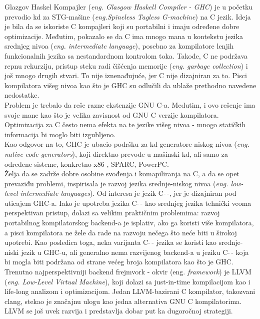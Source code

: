 Glazgov Haskel Kompajler (\emph {eng. Glasgow Haskell Compiler - GHC}) je u početku prevodio kd za STG-mašine (\emph{eng.Spineless Tagless G-machine}) na C jezik. Ideja je bila da se iskoriste C kompajleri koji su portabilni i imaju određene dobre optimizacije. Međutim, pokazalo se da C ima mnogo mana u kontekstu jezika srednjeg nivoa (\emph {eng. intermediate language}), posebno za kompilatore lenjih funkcionalnih jezika sa nestandardnom kontrolom toka. Takođe, C ne podržava repnu rekurziju, pristup steku radi čišćenja memorije (\emph{eng. garbage collection}) i još mnogo drugih stvari. To nije iznenađujuće, jer C nije dizajniran za to. Pisci kompilatora višeg nivoa kao što je GHC su odlučili da ublaže prethodno navedene nedostatke.\\

 \indent Problem je trebalo da reše razne ekstenzije GNU C-a. Međutim, i ovo rešenje ima svoje mane kao što je velika zavisnost od GNU C verzije kompilatora. Optimizacija za C često nema efekta na te jezike višeg nivoa - mnogo statičkih informacija bi moglo biti izgubljeno. \\
 
 \indent Kao odgovor na to, GHC je ubacio podršku za kd generatore niskog nivoa (\emph{eng. native code generators}), koji direktno prevode u mašinski kd, ali samo za određene sisteme, konkretno x86 , SPARC, PowerPC.\\
 
 \indent Želja da se zadrže dobre osobine svođenja i komapiliranja na C, a da se opet prevaziđu problemi, inspirisala je razvoj jezika srednje-niskog nivoa (\emph{eng. low-level intermediate languages}). Od interesa je jezik C-\,-, jer je dizajniran pod uticajem GHC-a. Iako je upotreba jezika C-\,- kao srednjeg jezika tehnički veoma perspektivan pristup, dolazi sa velikim praktičnim problemima: razvoj portabilnog kompilatorskog backend-a je isplativ, ako ga koristi više kompilatora, a pisci kompilatora ne žele da rade na razvoju nečega što neće biti u širokoj upotrebi. Kao posledica toga, neka varijanta C-\,- jezika se koristi kao srednje-niski jezik u GHC-u, ali generalno nema razvijenog backend-a u jeziku C-\,- koja bi mogla biti podržana od strane većeg broja kompilatora kao što je GHC.\\
 
 \indent Trenutno najperspektivniji backend frejmvork - okvir (eng. \emph{framework}) je LLVM (\emph{eng. Low-Level Virtual Machine}), koji dolazi sa just-in-time kompilacijom kao i life-long analizom i optimizacijom. Jedan LLVM-bazirani C kompilator, takozvani clang, stekao je značajnu ulogu kao jedna alternativa GNU C kompilatorima. LLVM se još uvek razvija i predstavlja dobar put ka dugoročnoj strategiji.

